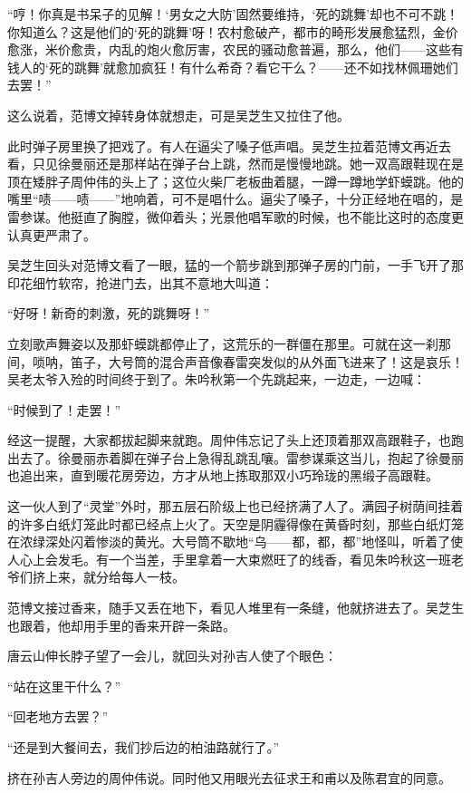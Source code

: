 \par “哼！你真是书呆子的见解！‘男女之大防’固然要维持，‘死的跳舞’却也不可不跳！你知道么？这是他们的‘死的跳舞’呀！农村愈破产，都市的畸形发展愈猛烈，金价愈涨，米价愈贵，内乱的炮火愈厉害，农民的骚动愈普遍，那么，他们——这些有钱人的‘死的跳舞’就愈加疯狂！有什么希奇？看它干么？——还不如找林佩珊她们去罢！”
\par 这么说着，范博文掉转身体就想走，可是吴芝生又拉住了他。
\par 此时弹子房里换了把戏了。有人在逼尖了嗓子低声唱。吴芝生拉着范博文再近去看，只见徐曼丽还是那样站在弹子台上跳，然而是慢慢地跳。她一双高跟鞋现在是顶在矮胖子周仲伟的头上了；这位火柴厂老板曲着腿，一蹲一蹲地学虾蟆跳。他的嘴里“啧——啧——”地响着，可不是唱什么。逼尖了嗓子，十分正经地在唱的，是雷参谋。他挺直了胸膛，微仰着头；光景他唱军歌的时候，也不能比这时的态度更认真更严肃了。
\par 吴芝生回头对范博文看了一眼，猛的一个箭步跳到那弹子房的门前，一手飞开了那印花细竹软帘，抢进门去，出其不意地大叫道：
\par “好呀！新奇的刺激，死的跳舞呀！”
\par 立刻歌声舞姿以及那虾蟆跳都停止了，这荒乐的一群僵在那里。可就在这一刹那间，唢呐，笛子，大号筒的混合声音像春雷突发似的从外面飞进来了！这是哀乐！吴老太爷入殓的时间终于到了。朱吟秋第一个先跳起来，一边走，一边喊：
\par “时候到了！走罢！”
\par 经这一提醒，大家都拔起脚来就跑。周仲伟忘记了头上还顶着那双高跟鞋子，也跑出去了。徐曼丽赤着脚在弹子台上急得乱跳乱嚷。雷参谋乘这当儿，抱起了徐曼丽也追出来，直到暖花房旁边，方才从地上拣取那双小巧玲珑的黑缎子高跟鞋。
\par 这一伙人到了“灵堂”外时，那五层石阶级上也已经挤满了人了。满园子树荫间挂着的许多白纸灯笼此时都已经点上火了。天空是阴霾得像在黄昏时刻，那些白纸灯笼在浓绿深处闪着惨淡的黄光。大号筒不歇地“乌——都，都，都”地怪叫，听着了使人心上会发毛。有一个当差，手里拿着一大束燃旺了的线香，看见朱吟秋这一班老爷们挤上来，就分给每人一枝。
\par 范博文接过香来，随手又丢在地下，看见人堆里有一条缝，他就挤进去了。吴芝生也跟着，他却用手里的香来开辟一条路。
\par 唐云山伸长脖子望了一会儿，就回头对孙吉人使了个眼色：
\par “站在这里干什么？”
\par “回老地方去罢？”
\par “还是到大餐间去，我们抄后边的柏油路就行了。”
\par 挤在孙吉人旁边的周仲伟说。同时他又用眼光去征求王和甫以及陈君宜的同意。
